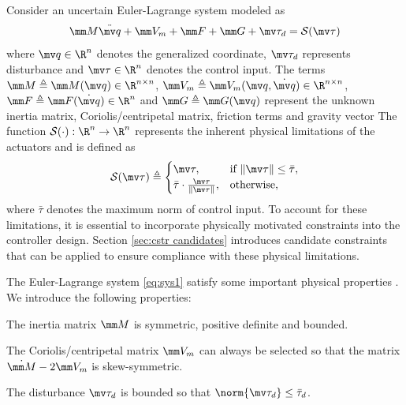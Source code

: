 \documentclass[lettersize,journal]{IEEEtran}
\newcommand*{\sat}{\mathcal{S}}
\newcommand*{\q}{\mv q}
\newcommand*{\dq}{\dot{\mv q}}
\newcommand*{\ddq}{\ddot{\mv q}}
\begin{document}
Consider an uncertain Euler-Lagrange system modeled as
\begin{equation}
    \mm M\ddq + \mm V_m + \mm F + \mm G + \mv\tau_d
    =
    \sat(\mv\tau)
    \label{eq:sys1}
\end{equation}
where $\q\in \R^n$ denotes the generalized coordinate, $\mv \tau_d$ represents disturbance and $\mv\tau\in\R^n$ denotes the control input. 
The terms $\mm M\triangleq\mm M(\q)\in\R^{n\times n}$, $\mm V_m\triangleq\mm V_m(\q,\dq)\in\R^{n\times n}$, $\mm F\triangleq\mm F(\dq)\in\R^{n}$ and $\mm G\triangleq\mm G(\q)$ represent the unknown inertia matrix, Coriolis/centripetal matrix, friction terms and gravity vector
The function $\sat(\cdot):\R^n\to\R^n$ represents the inherent physical limitations of the actuators and is defined as 
\begin{equation}
    \sat(\mv\tau)
    \triangleq
    \begin{cases}
        \mv\tau, 
        & 
        \text{if } \Vert\mv\tau\Vert\le \bar\tau,
        \\
        \bar\tau
        \cdot
        \tfrac{\mv\tau}{\Vert\mv\tau\Vert}, 
        & 
        \text{otherwise},
    \end{cases}
\end{equation}
where $\bar\tau$ denotes the maximum norm of control input.
To account for these limitations, it is essential to incorporate physically motivated constraints into the controller design.
Section \ref{sec:cstr candidates} introduces candidate constraints that can be applied to ensure compliance with these physical limitations.

The Euler-Lagrange system \eqref{eq:sys1} satisfy some important physical properties \cite[see, Chap. 3 Tab. 3.2.1]{Lewis:1998aa}.
We introduce the following properties:
\begin{prop} \cite{Lewis:1998aa}
    The inertia matrix $\mm M$ is symmetric, positive definite and bounded.
    \label{prop:M}
\end{prop}

\begin{prop} \cite{Lewis:1998aa}
    The Coriolis/centripetal matrix $\mm V_m$ can always be selected so that the matrix $\dot{\mm M}-2\mm V_m$ is skew-symmetric.
    \label{prop:skew}
\end{prop}

\begin{prop}
    The disturbance $\mv\tau_d$ is bounded so that $\norm{\mv\tau_d}\le \bar\tau_d$.
\end{prop}
\end{document}
